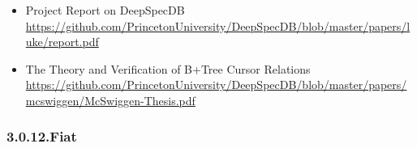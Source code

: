 \documentclass[12pt,twoside]{article}
\begin{document}
\begin{itemize}[noitemsep,topsep=\mdcompacttopsep]
\begin{itemize}[noitemsep,topsep=\mdcompacttopsep]
\item{}Project Report on DeepSpecDB
\href{https://github.com/PrincetonUniversity/DeepSpecDB/blob/master/papers/luke/report.pdf}{{\ttfamily https://\hspace{0pt}github.\hspace{0pt}com/\hspace{0pt}PrincetonUniversity/\hspace{0pt}DeepSpecDB/\hspace{0pt}blob/\hspace{0pt}master/\hspace{0pt}papers/\hspace{0pt}luke/\hspace{0pt}report.\hspace{0pt}pdf}}%

\item{}The Theory and Verification of B+Tree Cursor Relations
\href{https://github.com/PrincetonUniversity/DeepSpecDB/blob/master/papers/mcswiggen/McSwiggen-Thesis.pdf}{{\ttfamily https://\hspace{0pt}github.\hspace{0pt}com/\hspace{0pt}PrincetonUniversity/\hspace{0pt}DeepSpecDB/\hspace{0pt}blob/\hspace{0pt}master/\hspace{0pt}papers/\hspace{0pt}mcswiggen/\hspace{0pt}McSwiggen-\hspace{0pt}Thesis.\hspace{0pt}pdf}}%
\end{itemize}%
\end{itemize}%

\subsubsection{3.0.12.\hspace*{0.5em}Fiat}\label{sec-fiat}%
\end{document}
